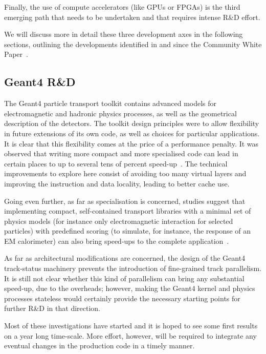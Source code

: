 Finally, the use of compute
accelerators (like GPUs or FPGAs) is the third emerging path that needs
to be undertaken and that requires intense R\&D effort.


We will discuss
more in detail these three development axes in the following sections, 
outlining the developments identified in and since the
Community White Paper~\cite{Albrecht2019, SimFoundation2018hep}. 

\hypertarget{geant4-rd}{%
\subsection{Geant4 R\&D}\label{geant4-rd}}

The Geant4 particle transport toolkit contains advanced models for
electromagnetic and hadronic physics processes, as well as the
geometrical description of the detectors. The toolkit design principles
were to allow flexibility in future extensions of its own code, as well
as choices for particular applications. It is clear that this
flexibility comes at the price of a performance penalty. It was observed that
writing more compact and more specialised code can lead in certain
places to up to several tens of percent speed-up~\cite{GeantV-2019, GeantV-2020}. The
technical improvements to explore here consist of avoiding too many
virtual layers and improving the instruction and data locality, leading
to better cache use.

Going even further, as far as specialisation is
concerned, studies suggest that implementing compact, self-contained
transport libraries with a minimal set of physics models (for instance
only electromagnetic interaction for selected particles) with predefined
scoring (to simulate, for instance, the response of an EM calorimeter)
can also bring speed-ups to the complete application~\cite{GeantV-2019, GeantV-2020}.

As
far as architectural modifications are concerned, the design of the
Geant4 track-status machinery prevents the introduction of fine-grained
track parallelism. It is still not clear whether this kind of
parallelism can bring any substantial speed-up, due to the overheads;
however, making the Geant4 kernel and physics processes stateless would
certainly provide the necessary starting points for further R\&D in that
direction.

Most of these investigations have started and it is hoped to
see some first results on a year long time-scale. More effort, however, will
be required to integrate any eventual changes in the production code in
a timely manner.


